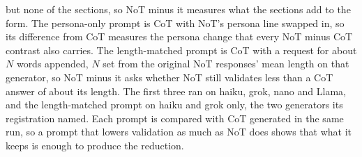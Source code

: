 but none of the sections, so NoT minus it measures what the sections add to
the form. The persona-only prompt is CoT with NoT's persona line swapped in,
so its difference from CoT measures the persona change that every NoT minus
CoT contrast also carries. The length-matched prompt is CoT with a request
for about $N$ words appended, $N$ set from the original NoT responses' mean
length on that generator, so NoT minus it asks whether NoT still validates
less than a CoT answer of about its length. The first three ran on haiku,
grok, nano and Llama, and the length-matched prompt on haiku and grok only,
the two generators its registration named. Each prompt is compared with CoT
generated in the same run, so a prompt that lowers validation as much as NoT
does shows that what it keeps is enough to produce the reduction.

